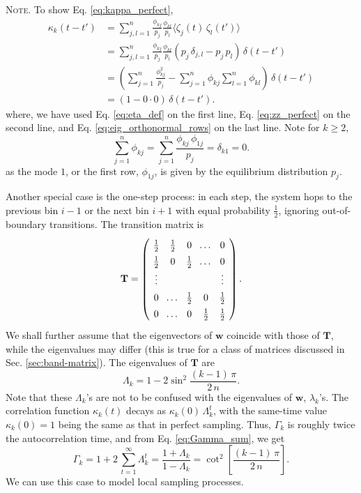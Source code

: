 \documentclass[reprint]{revtex4-1}
\newcommand{\note}[1]{{\color{DarkGreen}\footnotesize \textsc{Note.} #1}}
\begin{document}
\note{To show Eq. \eqref{eq:kappa_perfect},
  $$
  \begin{aligned}
  \kappa_k(t - t')
  &=
  \sum_{j,l = 1}^n
  \frac{ \phi_{kj} } { p_j }
  \frac{ \phi_{kl} } { p_l }
  \langle \zeta_j(t) \, \zeta_l(t') \rangle
  \\
  &=
  \sum_{j,l = 1}^n
  \frac{ \phi_{kj} } { p_j }
  \frac{ \phi_{kl} } { p_l }
  \left(
    p_j \, \delta_{j, l} - p_j \, p_l
  \right)
  \, \delta(t - t')
  \\
  &=
  \left(
    \sum_{j = 1}^n
    \frac{ \phi_{kj}^2 } { p_j }
    -
    \sum_{j = 1}^n \phi_{kj}
    \sum_{l = 1}^n \phi_{kl}
  \right)
  \, \delta(t - t')
  \\
  &=
  (1 - 0 \cdot 0) \, \delta(t - t').
  \end{aligned}
  $$
  where,
  we have used
  Eq. \eqref{eq:eta_def}
  on the first line,
  Eq. \eqref{eq:zz_perfect}
  on the second line,
  and
  Eq. \eqref{eq:eig_orthonormal_rows}
  on the last line.
  Note for $k \ge 2$,
  $$
  \sum_{j = 1}^n \phi_{kj}
  =
  \sum_{j = 1}^n \frac{ \phi_{kj} \, \phi_{1j} } { p_j }
  =
  \delta_{k1}
  =
  0.
  $$
  as the mode $1$, or the first row, $\phi_{1j}$,
  is given by the equilibrium distribution $p_j$.
}


Another special case is the one-step process\cite{vankampen}:
in each step, the system hops to the previous bin $i - 1$
or the next bin $i + 1$ with equal probability $\frac 1 2$,
ignoring out-of-boundary transitions.
%
The transition matrix is
%
\begin{equation}
\arraycolsep=3.6pt\def\arraystretch{1.4}
\mathbf T
=
\left(
  \begin{array}{cccccccc}
    \frac 1 2 & \frac 1 2 & 0 & \dots & 0 \\
    \frac 1 2 & 0         & \frac 1 2 & \dots & 0 \\
    \vdots & &  & & \vdots \\
    0 & \dots & \frac 1 2 & 0  & \frac 1 2 \\
    0 & \dots & 0 & \frac 1 2 & \frac 1 2
  \end{array}
\right).
\label{eq:T_tridiag}
\end{equation}
%
We shall further assume that
the eigenvectors of $\mathbf w$
coincide with those of $\mathbf T$,
while the eigenvalues may differ
(this is true for a class of matrices
discussed in Sec. \ref{sec:band-matrix}).
%
The eigenvalues of $\mathbf T$ are
$$
\Lambda_k = 1 - 2 \sin^2 \frac{ (k - 1) \, \pi } { 2 \, n }.
$$
Note that these $\Lambda_k$'s are
not to be confused with the eigenvalues of $\mathbf w$,
$\lambda_k$'s.
%
The correlation function $\kappa_k(t)$
decays as $\kappa_k(0) \, \Lambda_k^t$,
with the same-time value $\kappa_k(0) = 1$ being the same as
that in perfect sampling.
%
Thus,
$\Gamma_k$ is roughly twice
the autocorrelation time,
and from Eq. \eqref{eq:Gamma_sum}, we get
%
\begin{equation}
\Gamma_k
=
1 + 2 \, \sum_{t = 1}^\infty \Lambda_k^t
=
\frac{ 1 + \Lambda_k } { 1 - \Lambda_k }
=
\cot^2 \left[ \frac{ (k - 1) \, \pi } { 2 \, n } \right].
\label{eq:Gamma_onestep}
\end{equation}
%
We can use this case to model local sampling processes.
\end{document}
